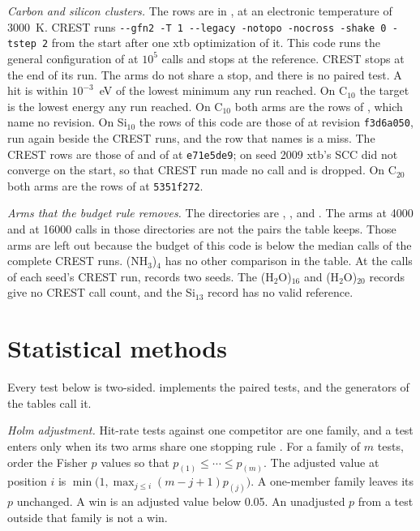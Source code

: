 \documentclass[journal=jctcce,manuscript=suppinfo]{achemso}
\begin{document}
\emph{Carbon and silicon clusters.}
The rows are in , at an electronic
temperature of 3000~K.
CREST runs \texttt{-{}-gfn2 -T 1 -{}-legacy -notopo -nocross -shake 0
-tstep 2} from the start after one xtb optimization of it.
This code runs the general configuration of
 at \(10^{5}\) calls and stops at the
reference.
CREST stops at the end of its run.
The arms do not share a stop, and there is no paired test.
A hit is within \(10^{-3}\)~eV of the lowest minimum any run reached.
On C\(_{10}\) the target is the lowest energy any run reached.
On C\(_{10}\) both arms are the rows of , which name no
revision.
On Si\(_{10}\) the rows of this code are those of  at
revision \texttt{f3d6a050}, run again beside the CREST runs, and the row
that  names is a miss.
The CREST rows are those of  and of  at
\texttt{e71e5de9}; on seed 2009 xtb's SCC did not converge on the start, so
that CREST run made no call and is dropped.
On C\(_{20}\) both arms are the rows of  at
\texttt{5351f272}.

\emph{Arms that the budget rule removes.}
The directories are ,
, and .
The arms at 4000 and at 16000 calls in those directories are not the pairs
the table keeps.
Those arms are left out because the budget of this code is below the median
calls of the complete CREST runs.
(NH\(_3\))\(_4\) has no other comparison in the table.
At the calls of each seed's CREST run, 
records two seeds.
The (H\(_2\)O)\(_{16}\) and (H\(_2\)O)\(_{20}\) records give no CREST call
count, and the Si\(_{13}\) record has no valid reference.

\section{Statistical methods}
\label{sec:si-stats}
Every test below is two-sided.
 implements the paired tests, and the
generators of the tables call it.

\emph{Holm adjustment.}
Hit-rate tests against one competitor are one family, and a test enters
only when its two arms share one stopping rule \cite{holm1979}.
For a family of \(m\) tests, order the Fisher \(p\) values so that
\(p_{(1)}\le \cdots\le p_{(m)}\).
The adjusted value at position \(i\) is
\(\min\bigl(1,\max_{j\le i}(m-j+1)p_{(j)}\bigr)\).
A one-member family leaves its \(p\) unchanged.
A win is an adjusted value below 0.05.
An unadjusted \(p\) from a test outside that family is not a win.
\end{document}

